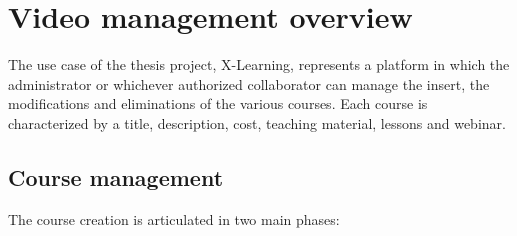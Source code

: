 \section{Video management overview}
\label{sec:Video_management_overview}

The use case of the thesis project, X-Learning, represents a platform in which the administrator or whichever authorized collaborator can manage the insert, the modifications and eliminations of the various courses.
Each course is characterized by a title, description, cost, teaching material, lessons and webinar.

\subsection{Course management}
\label{sec:course_management}

The course creation is articulated in two main phases:

